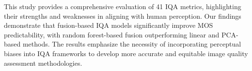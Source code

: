 This study provides a comprehensive evaluation of 41 IQA metrics, highlighting their strengths and weaknesses in aligning with human perception. Our findings demonstrate that fusion-based IQA models significantly improve MOS predictability, with random forest-based fusion outperforming linear and PCA-based methods. The results emphasize the necessity of incorporating perceptual biases into IQA frameworks to develop more accurate and equitable image quality assessment methodologies. 
